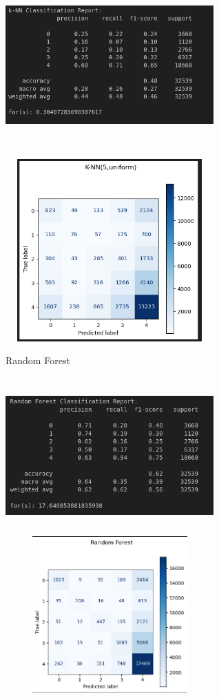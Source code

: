 \documentclass{article}
\begin{document}
 \begin{center}
    \includegraphics[width=8cm, height=7cm]{images/knn-f1.png}
    \includegraphics[width=8cm, height=7cm]{images/knn-confusion.png}
 \end{center}
 \begin{center}
    Random Forest
 \end{center}
 \begin{center}
    \includegraphics[width=8cm, height=6cm]{images/random-forest-f1.png}
    \includegraphics[width=8cm, height=6cm]{images/rf-confusion.png}
 \end{center}
\end{document}
